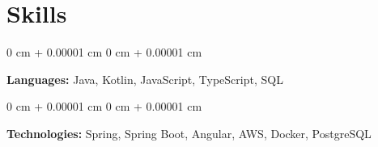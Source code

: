 \documentclass[10pt, letterpaper]{article}
\newenvironment{onecolentry}{
    \begin{adjustwidth}{
        0 cm + 0.00001 cm
    }{
        0 cm + 0.00001 cm
    }
}{
    \end{adjustwidth}
} %
\begin{document}
    
    \section{Skills}



        
        \begin{onecolentry}
            \textbf{Languages:} Java, Kotlin, JavaScript, TypeScript, SQL
        \end{onecolentry}

        \vspace{0.2 cm}

        \begin{onecolentry}
            \textbf{Technologies:} Spring, Spring Boot, Angular, AWS, Docker, PostgreSQL
        \end{onecolentry}


    
\end{document}
